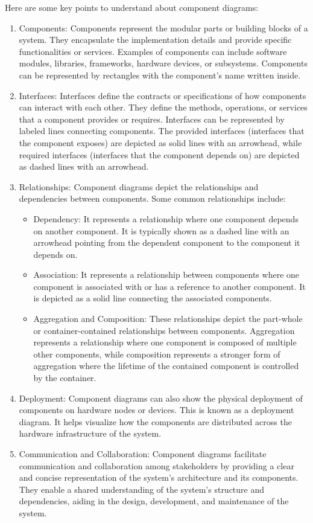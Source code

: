 \documentclass{article}
\begin{document}
Here are some key points to understand about component diagrams:
\begin{enumerate}
    \item Components: Components represent the modular parts or building blocks of a system. They encapsulate the implementation details and provide specific functionalities or services. Examples of components can include software modules, libraries, frameworks, hardware devices, or subsystems. Components can be represented by rectangles with the component's name written inside.
    \item Interfaces: Interfaces define the contracts or specifications of how components can interact with each other. They define the methods, operations, or services that a component provides or requires. Interfaces can be represented by labeled lines connecting components. The provided interfaces (interfaces that the component exposes) are depicted as solid lines with an arrowhead, while required interfaces (interfaces that the component depends on) are depicted as dashed lines with an arrowhead.
    \item Relationships: Component diagrams depict the relationships and dependencies between components. Some common relationships include:
        \begin{itemize}
            \item  Dependency: It represents a relationship where one component depends on another component. It is typically shown as a dashed line with an arrowhead pointing from the dependent component to the component it depends on.
            \item  Association: It represents a relationship between components where one component is associated with or has a reference to another component. It is depicted as a solid line connecting the associated components.
            \item  Aggregation and Composition: These relationships depict the part-whole or container-contained relationships between components. Aggregation represents a relationship where one component is composed of multiple other components, while composition represents a stronger form of aggregation where the lifetime of the contained component is controlled by the container.
        \end{itemize}
    \item Deployment: Component diagrams can also show the physical deployment of components on hardware nodes or devices. This is known as a deployment diagram. It helps visualize how the components are distributed across the hardware infrastructure of the system.
    \item Communication and Collaboration: Component diagrams facilitate communication and collaboration among stakeholders by providing a clear and concise representation of the system's architecture and its components. They enable a shared understanding of the system's structure and dependencies, aiding in the design, development, and maintenance of the system.
\end{enumerate}
\end{document}
